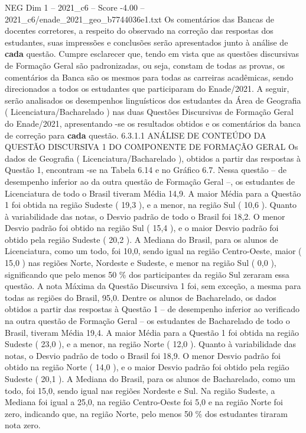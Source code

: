 \begin{textsample}{NEG Dim 1 – 2021\_c6 – Score -4.00 – 2021\_c6/enade\_2021\_geo\_b7744036e1.txt}
Os comentários das Bancas de docentes corretores, a respeito do observado na correção das respostas dos estudantes, suas impressões e conclusões serão apresentados junto à análise de \textbf{cada} questão.
Cumpre esclarecer que, tendo em vista que as questões discursivas de Formação Geral são padronizadas, ou seja, constam de todas as provas, os comentários da Banca são os mesmos para todas as carreiras acadêmicas, sendo direcionados a todos os estudantes que participaram do Enade/2021.
A seguir, serão analisados os desempenhos linguísticos dos estudantes da Área de Geografia ( Licenciatura/Bacharelado ) nas duas Questões Discursivas de Formação Geral do Enade/2021, apresentando -se os resultados obtidos e os comentários da banca de correção para \textbf{cada} questão. 6.3.1.1 ANÁLISE DE CONTEÚDO DA QUESTÃO DISCURSIVA 1 DO COMPONENTE DE FORMAÇÃO GERAL Os dados de Geografia ( Licenciatura/Bacharelado ), obtidos a partir das respostas à Questão 1, encontram -se na Tabela 6.14 e no Gráfico 6.7.
Nessa questão – de desempenho inferior ao da outra questão de Formação Geral –, os estudantes de Licenciatura de todo o Brasil tiveram Média 14,9.
A maior Média para a Questão 1 foi obtida na região Sudeste ( 19,3 ), e a menor, na região Sul ( 10,6 ).
Quanto à variabilidade das notas, o Desvio padrão de todo o Brasil foi 18,2.
O menor Desvio padrão foi obtido na região Sul ( 15,4 ), e o maior Desvio padrão foi obtido pela região Sudeste ( 20,2 ).
A Mediana do Brasil, para os alunos de Licenciatura, como um todo, foi 10,0, sendo igual na região Centro-Oeste, maior ( 15,0 ) nas regiões Norte, Nordeste e Sudeste, e menor na região Sul ( 0,0 ), significando que pelo menos 50 \% dos participantes da região Sul zeraram essa questão.
A nota Máxima da Questão Discursiva 1 foi, sem exceção, a mesma para todas as regiões do Brasil, 95,0.
Dentre os alunos de Bacharelado, os dados obtidos a partir das respostas à Questão 1 – de desempenho inferior ao verificado na outra questão de Formação Geral – os estudantes de Bacharelado de todo o Brasil, tiveram Média 19,4.
A maior Média para a Questão 1 foi obtida na região Sudeste ( 23,0 ), e a menor, na região Norte ( 12,0 ).
Quanto à variabilidade das notas, o Desvio padrão de todo o Brasil foi 18,9.
O menor Desvio padrão foi obtido na região Norte ( 14,0 ), e o maior Desvio padrão foi obtido pela região Sudeste ( 20,1 ).
A Mediana do Brasil, para os alunos de Bacharelado, como um todo, foi 15,0, sendo igual nas regiões Nordeste e Sul.
Na região Sudeste, a Mediana foi igual a 25,0, na região Centro-Oeste foi 5,0 e na região Norte foi zero, indicando que, na região Norte, pelo menos 50 \% dos estudantes tiraram nota zero.

\end{textsample}

